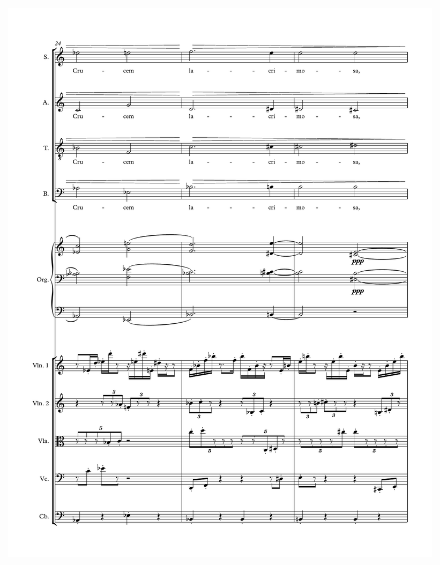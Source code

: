 \begin{figure}[htbp]
    \centering
	\includegraphics[width=6.5in]{figures/Stabat_Mater_5.pdf}
\end{figure}

